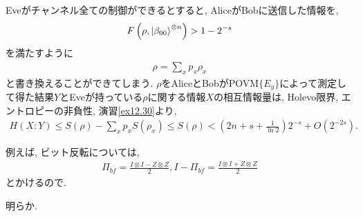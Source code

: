 \begin{ex}
    \label{ex12.31}
    Eveがチャンネル全ての制御ができるとすると, AliceがBobに送信した情報を, 
    \begin{align*}
        F\left( \rho, \ket{\beta_{00}}^{\otimes n} \right) > 1 - 2^{-s}
    \end{align*}
    を満たすように
    \begin{align*}
        \rho = \sum_x p_x \rho_x
    \end{align*}
    と書き換えることができてしまう. $\rho$をAliceとBobがPOVM$\{ E_y\}$によって測定して得た結果$Y$とEveが持っている$\rho$に関する情報$X$の相互情報量は, Holevo限界, エントロピーの非負性, 演習\ref{ex12.30}より, 
    \begin{align*}
        H(X:Y) \le S(\rho) - \sum_x p_x S \left(\rho_x \right) \le S(\rho) 
        < \left(2n + s + \frac{1}{\ln2} \right)2^{-s} + O(2^{-2s}).
    \end{align*}
\end{ex}

\begin{ex}
    \label{ex12.32}
    例えば, ビット反転については, 
    \begin{align*}
        \Pi_{bf} = \frac{I \otimes I - Z \otimes Z}{2}, I - \Pi_{bf} = \frac{I \otimes I + Z \otimes Z}{2}
    \end{align*}
    とかけるので.
\end{ex}

\begin{ex}
    \label{ex12.33}
\end{ex}

\begin{ex}
    \label{ex12.34}
\end{ex}

\begin{ex}
    \label{ex12.35}
\end{ex}

\begin{ex}
    \label{ex12.36}
    明らか.
\end{ex}